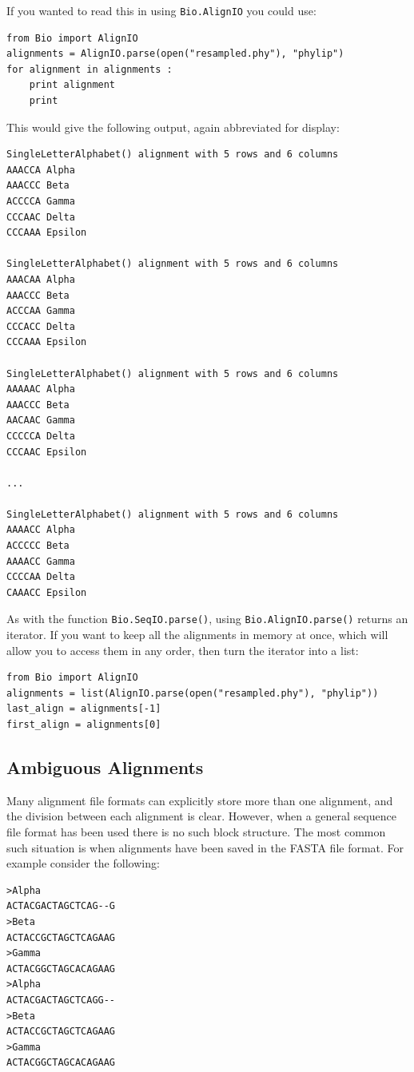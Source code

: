 \documentclass{report}
\begin{document}
If you wanted to read this in using \verb|Bio.AlignIO| you could use:

\begin{verbatim}
from Bio import AlignIO
alignments = AlignIO.parse(open("resampled.phy"), "phylip")
for alignment in alignments :
    print alignment
    print
\end{verbatim}

\noindent This would give the following output, again abbreviated for display:

\begin{verbatim}
SingleLetterAlphabet() alignment with 5 rows and 6 columns
AAACCA Alpha
AAACCC Beta
ACCCCA Gamma
CCCAAC Delta
CCCAAA Epsilon

SingleLetterAlphabet() alignment with 5 rows and 6 columns
AAACAA Alpha
AAACCC Beta
ACCCAA Gamma
CCCACC Delta
CCCAAA Epsilon

SingleLetterAlphabet() alignment with 5 rows and 6 columns
AAAAAC Alpha
AAACCC Beta
AACAAC Gamma
CCCCCA Delta
CCCAAC Epsilon

...

SingleLetterAlphabet() alignment with 5 rows and 6 columns
AAAACC Alpha
ACCCCC Beta
AAAACC Gamma
CCCCAA Delta
CAAACC Epsilon
\end{verbatim}

As with the function \verb|Bio.SeqIO.parse()|, using \verb|Bio.AlignIO.parse()| returns an iterator.
If you want to keep all the alignments in memory at once, which will allow you to access them in any order, then turn the iterator into a list:

\begin{verbatim}
from Bio import AlignIO
alignments = list(AlignIO.parse(open("resampled.phy"), "phylip"))
last_align = alignments[-1]
first_align = alignments[0]
\end{verbatim}

\subsection{Ambiguous Alignments}
\label{sec:AlignIO-count-argument}
Many alignment file formats can explicitly store more than one alignment, and the division between each alignment is clear.  However, when a general sequence file format has been used there is no such block structure.  The most common such situation is when alignments have been saved in the FASTA file format.  For example consider the following:

\begin{verbatim}
>Alpha
ACTACGACTAGCTCAG--G
>Beta
ACTACCGCTAGCTCAGAAG
>Gamma
ACTACGGCTAGCACAGAAG
>Alpha
ACTACGACTAGCTCAGG--
>Beta
ACTACCGCTAGCTCAGAAG
>Gamma
ACTACGGCTAGCACAGAAG
\end{verbatim}
\end{document}
